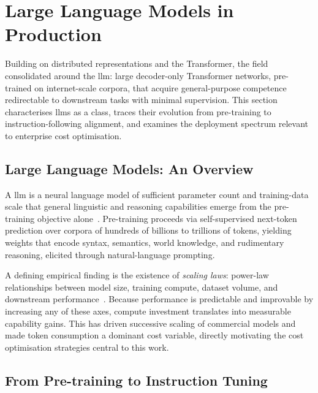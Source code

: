 \section{Large Language Models in Production}
\label{sec:llms-in-production}

Building on distributed representations and the Transformer, the field consolidated around the \gls{llm}: large decoder-only Transformer networks, pre-trained on internet-scale corpora, that acquire general-purpose competence redirectable to downstream tasks with minimal supervision. This section characterises \glspl{llm} as a class, traces their evolution from pre-training to instruction-following alignment, and examines the deployment spectrum relevant to enterprise cost optimisation.

\subsection{Large Language Models: An Overview}
\label{sec:llm-overview}

A \gls{llm} is a neural language model of sufficient parameter count and training-data scale that general linguistic and reasoning capabilities emerge from the pre-training objective alone~\cite{brown2020gpt3}. Pre-training proceeds via self-supervised next-token prediction over corpora of hundreds of billions to trillions of tokens, yielding weights that encode syntax, semantics, world knowledge, and rudimentary reasoning, elicited through natural-language prompting.

A defining empirical finding is the existence of \textit{scaling laws}: power-law relationships between model size, training compute, dataset volume, and downstream performance~\cite{brown2020gpt3}. Because performance is predictable and improvable by increasing any of these axes, compute investment translates into measurable capability gains. This has driven successive scaling of commercial models and made token consumption a dominant cost variable, directly motivating the cost optimisation strategies central to this work.

\subsection{From Pre-training to Instruction Tuning}
\label{sec:instruction-tuning}

